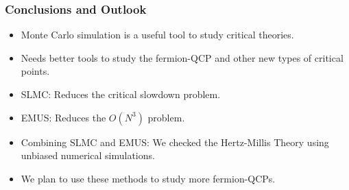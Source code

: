 \documentclass[xcolor=table, 10pt, aspectratio=43]{beamer}
\begin{document}
\begin{frame}
	\frametitle{Conclusions and Outlook}
	\begin{itemize}
		\item Monte Carlo simulation is a useful tool to study critical theories.
		\item Needs better tools to study the fermion-QCP and other new types of critical points.
		\item SLMC: Reduces the critical slowdown problem.
		\item EMUS: Reduces the $O(N^3)$ problem.
		\item Combining SLMC and EMUS: We checked the Hertz-Millis Theory using unbiased numerical simulations.
		\item We plan to use these methods to study more fermion-QCPs.
	\end{itemize}
\end{frame}
\end{document}
